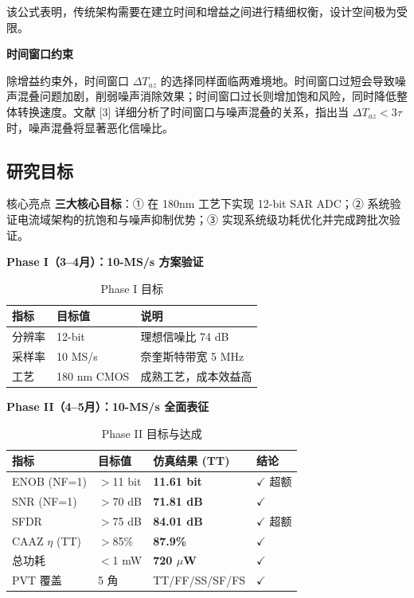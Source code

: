 \documentclass[11pt,a4paper,UTF8]{ctexart}
\begin{document}
该公式表明，传统架构需要在建立时间和增益之间进行精细权衡，设计空间极为受限。

\textbf{时间窗口约束}

除增益约束外，时间窗口 $\Delta T_{az}$ 的选择同样面临两难境地。时间窗口过短会导致噪声混叠问题加剧，削弱噪声消除效果；时间窗口过长则增加饱和风险，同时降低整体转换速度。文献 [3] 详细分析了时间窗口与噪声混叠的关系，指出当 $\Delta T_{az} < 3\tau$ 时，噪声混叠将显著恶化信噪比。

\subsection{研究目标}

\begin{findbox}{核心亮点}
\textbf{三大核心目标}：① 在 180nm 工艺下实现 12-bit SAR ADC；② 系统验证电流域架构的抗饱和与噪声抑制优势；③ 实现系统级功耗优化并完成跨批次验证。
\end{findbox}

\textbf{Phase I（3--4月）：10-MS/s 方案验证}

\begin{table}[htbp]\centering\caption{Phase I 目标}\label{tab:phase1-goal}\small
\begin{tabular}{lll}\toprule
\textbf{指标} & \textbf{目标值} & \textbf{说明} \\\midrule
分辨率 & 12-bit & 理想信噪比 74 dB \\
采样率 & 10 MS/s & 奈奎斯特带宽 5 MHz \\
工艺 & 180 nm CMOS & 成熟工艺，成本效益高 \\\bottomrule
\end{tabular}
\end{table}

\textbf{Phase II（4--5月）：10-MS/s 全面表征}

\begin{table}[htbp]\centering\caption{Phase II 目标与达成}\label{tab:phase2-goal}\small
\begin{tabular}{llll}\toprule
\textbf{指标} & \textbf{目标值} & \textbf{仿真结果 (TT)} & \textbf{结论} \\\midrule
ENOB (NF=1) & $>$11 bit & \textbf{11.61 bit} & $\checkmark$ 超额 \\
SNR (NF=1) & $>$70 dB & \textbf{71.81 dB} & $\checkmark$ \\
SFDR & $>$75 dB & \textbf{84.01 dB} & $\checkmark$ 超额 \\
CAAZ $\eta$ (TT) & $>$85\% & \textbf{87.9\%} & $\checkmark$ \\
总功耗 & $<$1 mW & \textbf{720 $\mu$W} & $\checkmark$ \\
PVT 覆盖 & 5 角 & TT/FF/SS/SF/FS & $\checkmark$ \\\bottomrule
\end{tabular}
\end{table}
\end{document}
